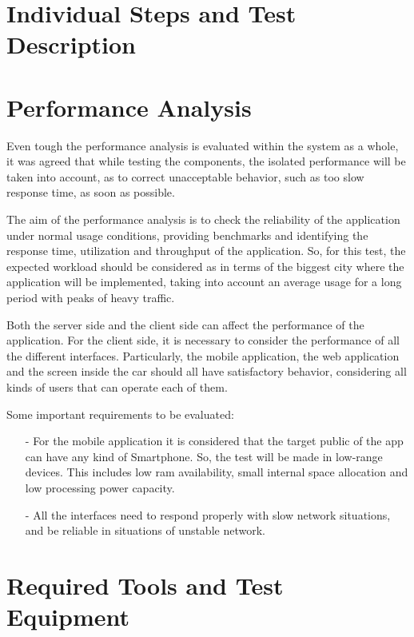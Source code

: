 \documentclass[a4paper]{article}
\begin{document}
\newpage
\section{Individual Steps and Test Description}
\newpage

\section{Performance Analysis}

Even tough the performance analysis is evaluated within the system as a whole, it was agreed that while testing the components, the isolated performance will be taken into account, as to correct unacceptable behavior, such as too slow response time, as soon as possible. 

The aim of the performance analysis is to check the reliability of the application under normal usage conditions, providing benchmarks and identifying the response time, utilization and throughput of the application. So, for this test, the expected workload should be considered as in terms of the biggest city where the application will be implemented, taking into account an average usage for a long period with peaks of heavy traffic. 

Both the server side and the client side can affect the performance of the application. For the client side,  it is necessary to consider the performance of all the different interfaces. Particularly, the mobile application, the web application and the screen inside the car should all have satisfactory behavior, considering all kinds of users that can operate each of them. 

Some important requirements to be evaluated:
\begin{itemize}
\item[-] For the mobile application it is considered that the target public of the app can have any kind of Smartphone. So, the test will be made in low-range devices. This includes low ram availability, small internal space allocation and low processing power capacity.
\item[-] All the interfaces need to respond properly with slow network situations, and be reliable in situations of unstable network. 

\end{itemize}
\newpage


\section{Required Tools and Test Equipment}
\end{document}
